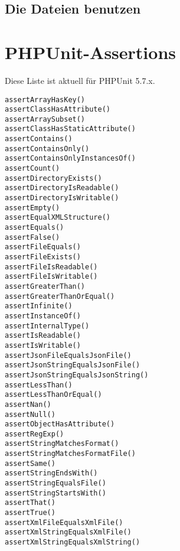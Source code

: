 \documentclass[a4paper,10pt,headsepline]{scrartcl}
\begin{document}
\subsection{Die Dateien benutzen}
\small
{}
\normalsize


\pagebreak
\section{PHPUnit-Assertions}
Diese Liste ist aktuell für PHPUnit 5.7.x.

\begin{verbatim}
assertArrayHasKey()
assertClassHasAttribute()
assertArraySubset()
assertClassHasStaticAttribute()
assertContains()
assertContainsOnly()
assertContainsOnlyInstancesOf()
assertCount()
assertDirectoryExists()
assertDirectoryIsReadable()
assertDirectoryIsWritable()
assertEmpty()
assertEqualXMLStructure()
assertEquals()
assertFalse()
assertFileEquals()
assertFileExists()
assertFileIsReadable()
assertFileIsWritable()
assertGreaterThan()
assertGreaterThanOrEqual()
assertInfinite()
assertInstanceOf()
assertInternalType()
assertIsReadable()
assertIsWritable()
assertJsonFileEqualsJsonFile()
assertJsonStringEqualsJsonFile()
assertJsonStringEqualsJsonString()
assertLessThan()
assertLessThanOrEqual()
assertNan()
assertNull()
assertObjectHasAttribute()
assertRegExp()
assertStringMatchesFormat()
assertStringMatchesFormatFile()
assertSame()
assertStringEndsWith()
assertStringEqualsFile()
assertStringStartsWith()
assertThat()
assertTrue()
assertXmlFileEqualsXmlFile()
assertXmlStringEqualsXmlFile()
assertXmlStringEqualsXmlString()
\end{verbatim}
\end{document}
